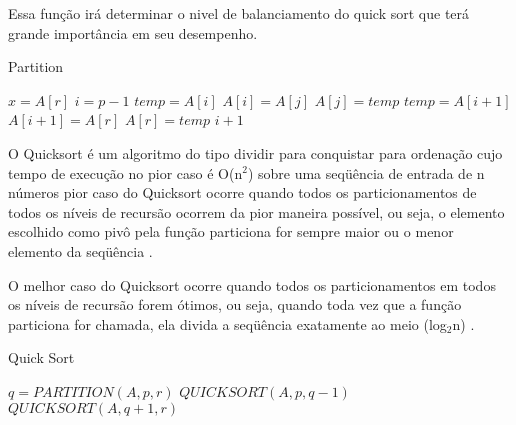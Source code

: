 \documentclass[12pt]{article}
\let\oldReturn\Return
\renewcommand{\Return}{\State\oldReturn}
\begin{document}
	Essa função irá determinar o nivel de balanciamento do quick sort que terá grande importância em seu desempenho.
	
	
	
	\begin{algorithm}[H]
		\caption{Partition}
		\begin{algorithmic}[1]	
				\State $x = A[r] $	
				\State $i = p - 1$
						\State$temp = A[i]$
						\State$A[i] = A[j]$
						\State$A[j] = temp$
					\EndIf
				\EndFor
				\State$temp = A[i + 1]$
				\State$A[i + 1] = A[r]$
				\State$A[r] = temp$
				\Return $i + 1$
			\EndFunction
			\end{algorithmic}
	\end{algorithm}
	
	
	
	O Quicksort é um algoritmo do tipo dividir para conquistar para ordenação cujo tempo de
execução  no  pior  caso  é O(n$^2$) sobre  uma  seqüência  de  entrada  de n números pior caso do Quicksort ocorre quando todos os particionamentos de todos os níveis de recursão ocorrem da pior maneira possível, ou seja, o elemento escolhido como pivô pela função particiona for sempre maior ou o menor elemento da seqüência \cite{prado2005analise}.

O melhor caso do Quicksort ocorre quando todos os particionamentos em todos os níveis de recursão forem ótimos, ou seja, quando toda vez que a função particiona for chamada, ela divida a seqüência exatamente ao meio (log$_2$n) \cite{prado2005analise}.
\begin{algorithm}[H]
		\caption{Quick Sort}
		\begin{algorithmic}[1]	
					\State$q = PARTITION(A, p, r)$
					\State$QUICKSORT(A, p, q - 1 )$
					\State$QUICKSORT(A, q +1, r)$
				\EndIf			
			\EndFunction
			
			
		\end{algorithmic}
	\end{algorithm}
	
	













\end{document}
